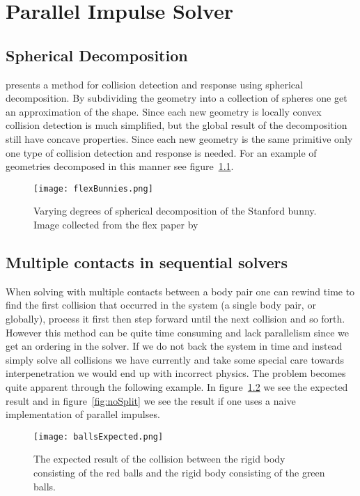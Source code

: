 \chapter{Parallel Impulse Solver}\label{cha:impl}

\section{Spherical Decomposition}
\cite{gpugems} presents a method for collision detection and response using spherical
decomposition. By subdividing the geometry into a collection of spheres one get an
approximation of the shape. Since each new geometry is locally convex collision
detection is much simplified, but the global result of the decomposition still have
concave properties. Since each new geometry is the same primitive only
one type of collision detection and response is needed. For an example of geometries
decomposed in this manner see figure~\ref{fig:bunnies}.

\begin{figure}[H]
  \centering
  \texttt{[image: flexBunnies.png]}
  \caption{Varying degrees of spherical decomposition of the Stanford bunny. Image collected from the flex paper by~\cite{flex}}
  \label{fig:bunnies}
\end{figure}

\section{Multiple contacts in sequential solvers}
When solving with multiple contacts between a body pair one can rewind time to
find the first collision
that occurred in the system (a single body pair, or globally), process it first
then step forward until the next collision and so forth. However this method can
be quite time consuming and lack parallelism since we get an ordering in the solver.
If we do not back the system in time and
instead simply solve all collisions we have currently and take some special care
towards interpenetration we would end up with incorrect physics. The problem
becomes quite apparent through the following example.
In figure~\ref{fig:ballsExpected} we see the expected result and in
figure~\ref{fig:noSplit} we see the result if one uses a naive implementation of
parallel impulses.

\begin{figure}[H]
  \centering
  \texttt{[image: ballsExpected.png]}
  \caption{The expected result of the collision between the rigid body consisting
  of the red balls and the rigid body consisting of the green balls.}
  \label{fig:ballsExpected}
\end{figure}

